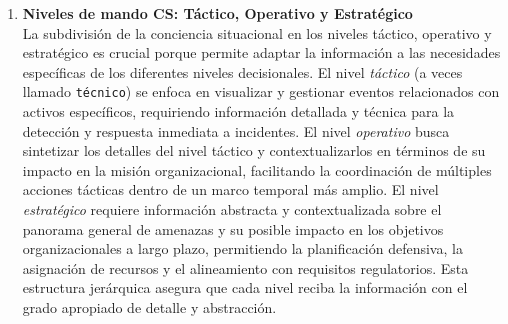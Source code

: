 \begin{enumerate}[resume]
\item \textbf{Niveles de mando CS: Táctico, Operativo y Estratégico} \\
La subdivisión de la conciencia situacional en los niveles táctico, operativo y estratégico es crucial porque permite adaptar la información a las necesidades específicas de los diferentes niveles decisionales. El nivel \textit{táctico} (a veces llamado \texttt{técnico}) se enfoca en visualizar y gestionar eventos relacionados con activos específicos, requiriendo información detallada y técnica para la detección y respuesta inmediata a incidentes. El nivel \textit{operativo} busca sintetizar los detalles del nivel táctico y contextualizarlos en términos de su impacto en la misión organizacional, facilitando la coordinación de múltiples acciones tácticas dentro de un marco temporal más amplio. El nivel \textit{estratégico} requiere información abstracta y contextualizada sobre el panorama general de amenazas y su posible impacto en los objetivos organizacionales a largo plazo, permitiendo la planificación defensiva, la asignación de recursos y el alineamiento con requisitos regulatorios. Esta estructura jerárquica asegura que cada nivel reciba la información con el grado apropiado de detalle y abstracción.
\end{enumerate}